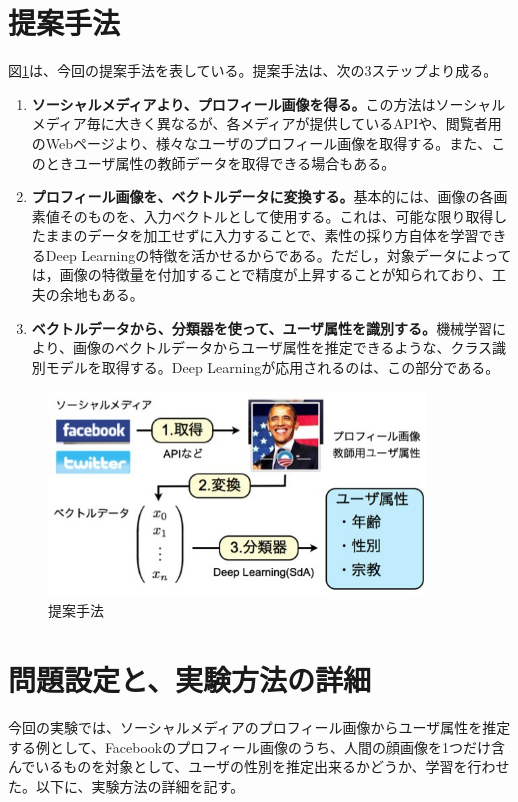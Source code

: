 \section{提案手法}
図\ref{c6_proposal}は、今回の提案手法を表している。提案手法は、次の3ステップより成る。
\begin{enumerate}
\item \textbf{ソーシャルメディアより、プロフィール画像を得る。}この方法はソーシャルメディア毎に大きく異なるが、各メディアが提供しているAPIや、閲覧者用のWebページより、様々なユーザのプロフィール画像を取得する。また、このときユーザ属性の教師データを取得できる場合もある。
\item \textbf{プロフィール画像を、ベクトルデータに変換する。}基本的には、画像の各画素値そのものを、入力ベクトルとして使用する。これは、可能な限り取得したままのデータを加工せずに入力することで、素性の採り方自体を学習できるDeep Learningの特徴を活かせるからである。ただし，対象データによっては，画像の特徴量を付加することで精度が上昇する\cite{ciresan2012multi-column}ことが知られており、工夫の余地もある。
\item \textbf{ベクトルデータから、分類器を使って、ユーザ属性を識別する。}機械学習により、画像のベクトルデータからユーザ属性を推定できるような、クラス識別モデルを取得する。Deep Learningが応用されるのは、この部分である。
\end{enumerate}


\begin{figure}[tbp]
 \begin{center}
  \includegraphics[width=100mm]{img/c6/proposal}
 \end{center}
 \caption{提案手法}
 \label{c6_proposal}
\end{figure}

\section{問題設定と、実験方法の詳細}
今回の実験では、ソーシャルメディアのプロフィール画像からユーザ属性を推定する例として、Facebookのプロフィール画像のうち、人間の顔画像を1つだけ含んでいるものを対象として、ユーザの性別を推定出来るかどうか、学習を行わせた。以下に、実験方法の詳細を記す。
